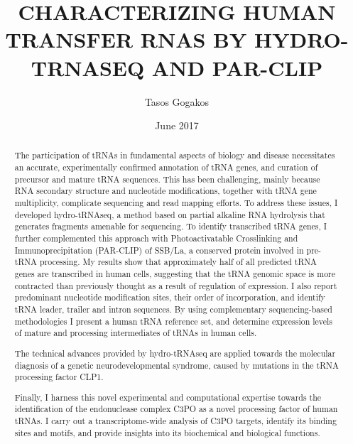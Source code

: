 \documentclass[12pt]{rockefeller}
\begin{document}
\author{Tasos Gogakos}
\title{\MakeUppercase{Characterizing human transfer rnas by hydro-trnaseq and par-clip}}
\date{June 2017}

\maketitle

\thispagestyle{empty}
\makecopyright

\begin{abstract}

The participation of tRNAs in fundamental aspects of biology and disease necessitates an accurate, experimentally confirmed annotation of tRNA genes, and curation of precursor and mature tRNA sequences. This has been challenging, mainly because RNA secondary structure and nucleotide modifications, together with tRNA gene multiplicity, complicate sequencing and read mapping efforts. To address these issues, I developed hydro-tRNAseq, a method based on partial alkaline RNA hydrolysis that generates fragments amenable for sequencing. To identify transcribed tRNA genes, I further complemented this approach with Photoactivatable Crosslinking and Immunoprecipitation (PAR-CLIP) of SSB/La, a conserved protein involved in pre-tRNA processing. My results show that approximately half of all predicted tRNA genes are transcribed in human cells, suggesting that the tRNA genomic space is more contracted than previously thought as a result of regulation of expression. I also report predominant nucleotide modification sites, their order of incorporation, and identify tRNA leader, trailer and intron sequences. By using complementary sequencing-based methodologies I present a human tRNA reference set, and determine expression levels of mature and processing intermediates of tRNAs in human cells.

The technical advances provided by hydro-tRNAseq are applied towards the molecular diagnosis of a genetic neurodevelopmental syndrome, caused by mutations in the tRNA processing factor CLP1. 

Finally, I harness this novel experimental and computational expertise towards the identification of the endonuclease complex C3PO as a novel processing factor of human tRNAs. I carry out a transcriptome-wide analysis of C3PO targets, identify its binding sites and motifs, and provide insights into its biochemical and biological functions. 

\end{abstract}
\end{document}
